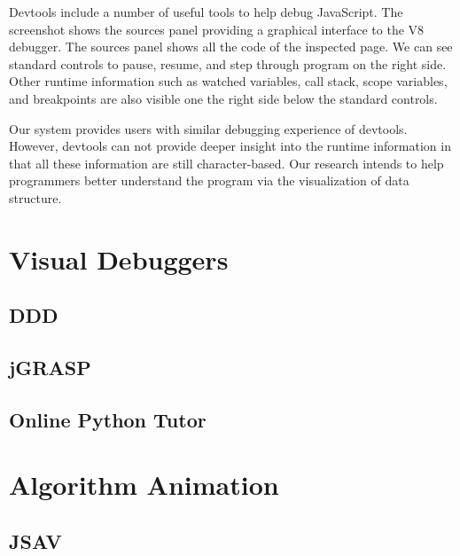 Devtools include a number of useful tools to help debug JavaScript. The screenshot shows the sources panel providing a graphical interface to the V8 debugger. The sources panel shows all the code of the inspected page. We can see standard controls to pause, resume, and step through program on the right side. Other runtime information such as watched variables, call stack, scope variables, and breakpoints are also visible one the right side below the standard controls.

Our system provides users with similar debugging experience of devtools. However, devtools can not provide deeper insight into the runtime information in that all these information are still character-based. Our research intends to help programmers better understand the program via the visualization of data structure.

\section {Visual Debuggers}

\subsection {DDD}

\subsection {jGRASP}

\subsection {Online Python Tutor}

\section {Algorithm Animation}

\subsection {JSAV}
